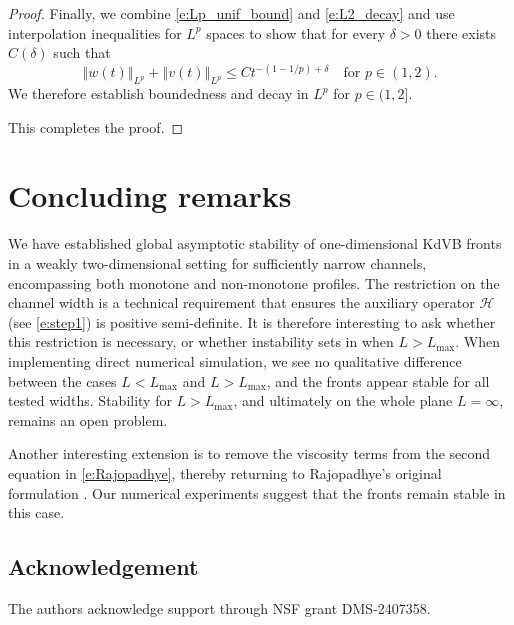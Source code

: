 \documentclass[final,11pt]{article}
\renewcommand{\leq}{\leqslant}
\theoremstyle{definition} %
\newcommand{\lv}{\left\Vert}
\newcommand{\rv}{\right\Vert}
\theoremstyle{plain}
\theoremstyle{definition} %
\theoremstyle{remark}
\begin{document}
\begin{proof}
Finally, we combine \eqref{e:Lp_unif_bound} and \eqref{e:L2_decay} and use interpolation inequalities for $L^p$ spaces to show that 
for every $\delta > 0$ there exists $C(\delta)$ such that 
\[
\lv w(t) \rv_{L^p}+\lv v(t) \rv_{L^p} \leq Ct^{-(1-1/p)+\delta} \quad \text{for $p\in (1,2)$}. 
\]
We therefore establish boundedness and decay in $L^p$ for $p\in (1,2]$. 

This completes the proof.
\end{proof}

\section{Concluding remarks}

We have established global asymptotic stability of one-dimensional KdVB fronts in a weakly two-dimensional setting for sufficiently narrow channels, encompassing both monotone and non-monotone profiles. The restriction on the channel width is a technical requirement that ensures the auxiliary operator $\mathcal{H}$ (see \eqref{e:step1}) is positive semi-definite. It is therefore interesting to ask whether this restriction is necessary, or whether instability sets in when $L>L_{\max}$. When implementing direct numerical simulation, we see no qualitative difference between the cases $L<L_{\max}$ and $L>L_{\max}$, and the fronts appear stable for all tested widths. 
Stability for $L>L_{\max}$, and ultimately on the whole plane $L=\infty$, remains an open problem.

Another interesting extension is to remove the viscosity terms from the second equation in \eqref{e:Rajopadhye}, thereby returning to Rajopadhye's original formulation \cite{Raj1996}. Our numerical experiments suggest that the fronts remain stable in this case. 


\subsection*{Acknowledgement} The authors acknowledge support through NSF grant DMS-2407358. 



\end{document}
